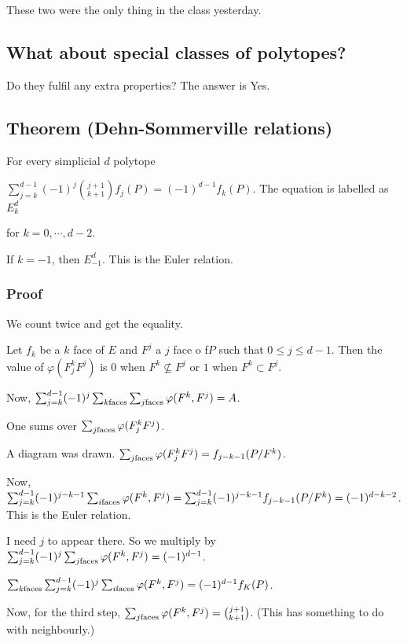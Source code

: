 \documentclass[11pt]{article}
\begin{document}
{{{{These two were the only thing in the class yesterday.
\subsection{What about special classes of polytopes?}
\label{sec:org5935140}
Do they fulfil any extra properties? The answer is Yes.
\subsection{Theorem (Dehn-Sommerville relations)}
\label{sec:org03cdf2f}
For every simplicial \(d\) polytope

\(\sum_{j = k}^{d-1} (-1)^j \binom{j + 1}{k + 1} f_j(P) = (-1)^{d - 1}
   f_k(P)\). The equation is labelled as \(E_k^d\)

for \(k = 0, \cdots, d -2\).

If \(k = -1\), then \(E_{-1}^d\). This is the Euler relation.
\subsubsection{Proof}
\label{sec:orgb19f93f}
We count twice and get the equality.

Let \(f_k\) be a \(k\) face of \(E\) and \(F^j\) a \(j\) face o f\(P\) such that \(0 \le
    j \le d - 1\). Then the value of \(\varphi(F^k_j F^j)\) is \(0\) when \(F^k
    \nsubseteq F^j\) or \(1\) when \(F^k \subset F^j\).

Now, \(\sum_{j = k}^{d - 1} (-1)^j \sum_{k \textup{faces}} \sum_{j
    \textup{faces}} \varphi(F^k, F^j) = A\).

One sums over \(\sum_{j \textup{faces}} \varphi(F^k_j F^j)\).

A diagram was drawn. \(\sum_{j \textup{faces}} \varphi(F^k_j F^j) = f_{j- k -
    1}(P/F^k)\).

Now, \(\sum_{j = k}^{d - 1} (-1)^{j - k - 1} \sum_{i \textup{faces}}
    \varphi(F^k, F^j) = \sum_{j = k}^{d-1} (-1)^{j - k - 1} f_{j - k -
    1}(P/F^{k}) = (-1)^{d - k - 2}\). This is the Euler relation.

I need \(j\) to appear there. So we multiply by \(\sum_{j =k}^{d-1} (-1)^j
    \sum_{j \textup{faces}} \varphi(F^k, F^j) = (-1)^{d-1}\).

\(\sum_{k \textup{faces}} \sum_{j = k}^{d -1} (-1)^j \sum_{i \textup{faces}}
    \varphi(F^k, F^j) = (-1)^{d - 1}f_K(P)\).

Now, for the third step, \(\sum_{j \textup{faces}} \varphi(F^k, F^j) =
    \binom{j + 1}{k + 1}\). (This has something to do with neighbourly.)

}}}}
\end{document}
